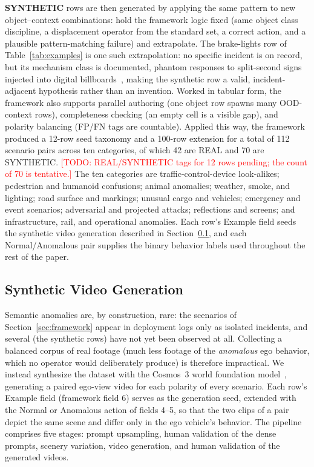 \documentclass[conference]{IEEEtran}
\newcommand{\todo}[1]{\textcolor{red}{[TODO: #1]}}
\begin{document}
\textbf{SYNTHETIC} rows are then generated by applying the same pattern to new object--context combinations: hold the framework logic fixed (same object class discipline, a displacement operator from the standard set, a correct action, and a plausible pattern-matching failure) and extrapolate. The brake-lights row of Table~\ref{tab:examples} is one such extrapolation: no specific incident is on record, but its mechanism class is documented, phantom responses to split-second signs injected into digital billboards~\cite{b29}, making the synthetic row a valid, incident-adjacent hypothesis rather than an invention. Worked in tabular form, the framework also supports parallel authoring (one object row spawns many OOD-context rows), completeness checking (an empty cell is a visible gap), and polarity balancing (FP/FN tags are countable). Applied this way, the framework produced a 12-row seed taxonomy and a 100-row extension for a total of 112 scenario pairs across ten categories, of which 42 are REAL and 70 are SYNTHETIC. \todo{REAL/SYNTHETIC tags for 12 rows pending; the count of 70 is tentative.} The ten categories are traffic-control-device look-alikes; pedestrian and humanoid confusions; animal anomalies; weather, smoke, and lighting; road surface and markings; unusual cargo and vehicles; emergency and event scenarios; adversarial and projected attacks; reflections and screens; and infrastructure, rail, and operational anomalies. Each row's Example field seeds the synthetic video generation described in Section~\ref{sec:videogen}, and each Normal/Anomalous pair supplies the binary behavior labels used throughout the rest of the paper.

\subsection{Synthetic Video Generation}\label{sec:videogen}

Semantic anomalies are, by construction, rare: the scenarios of Section~\ref{sec:framework} appear in deployment logs only as isolated incidents, and several (the synthetic rows) have not yet been observed at all. Collecting a balanced corpus of real footage (much less footage of the \emph{anomalous} ego behavior, which no operator would deliberately produce) is therefore impractical. We instead synthesize the dataset with the Cosmos~3 world foundation model~\cite{b30}, generating a paired ego-view video for each polarity of every scenario. Each row's Example field (framework field 6) serves as the generation seed, extended with the Normal or Anomalous action of fields 4--5, so that the two clips of a pair depict the same scene and differ only in the ego vehicle's behavior. The pipeline comprises five stages: prompt upsampling, human validation of the dense prompts, scenery variation, video generation, and human validation of the generated videos.
\end{document}
